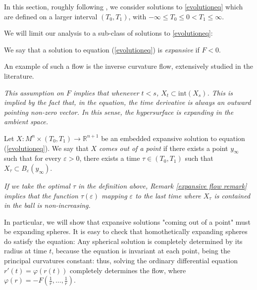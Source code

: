 In this section, roughly following \cite{SinestRisa}, we consider solutions to \ref{evolutioneq} which are defined on a larger interval $(T_0, T_1)$, with  $-\infty \leq T_0 \leq 0 < T_1 \leq \infty$. 

We will limit our analysis to a sub-class of solutions to \ref{evolutioneq}:
\begin{defin}
	We say that a solution to equation (\ref{evolutioneq}) is {\em expansive} if $F<0$. 
\end{defin}
An example of such a flow is the inverse curvature flow, extensively studied in the literature. 
\begin{oss}	
	\em This assumption on $F$ implies that whenever $t<s$, $X_t \subset \mathrm{int}(X_s)$. This is implied by the fact that, in the equation, the time derivative is always an outward pointing non-zero vector.\label{expansive flow remark} In this sense, the hypersurface is expanding in the ambient space.
\end{oss}
\begin{defin}
	Let $ X : M^n \times (T_0, T_1) \to \mathbb{R}^{n+1} $ be an embedded expansive solution to equation (\ref{evolutioneq}). We say that {\em $X$ comes out of a point} if there exists a point $y_\infty$ such that for every $\varepsilon>0$, there exists a time $\tau \in  (T_0, T_1)$ such that $X_\tau \subset B_\varepsilon(y_\infty)$.
\end{defin}

\begin{oss}	
	\em If we take the optimal $\tau$ in the definition above, Remark \ref{expansive flow remark} implies that the function $\tau(\varepsilon)$ mapping $\varepsilon$ to the last time where $X_\tau$ is contained in the ball is non-increasing.
\end{oss} 


In particular, we will show that expansive solutions "coming out of a point" must be expanding spheres.
It is easy to check that homothetically expanding spheres do satisfy the equation: Any spherical solution is completely determined by its radius at time $t$, because the equation is invariant at each point, being the principal curvatures constant: thus, solving the ordinary differential equation $r'(t) = \varphi(r(t))$ completely determines the flow, where $\varphi(r) = -F(\frac{1}{r}, \dots, \frac{1}{r})$.

